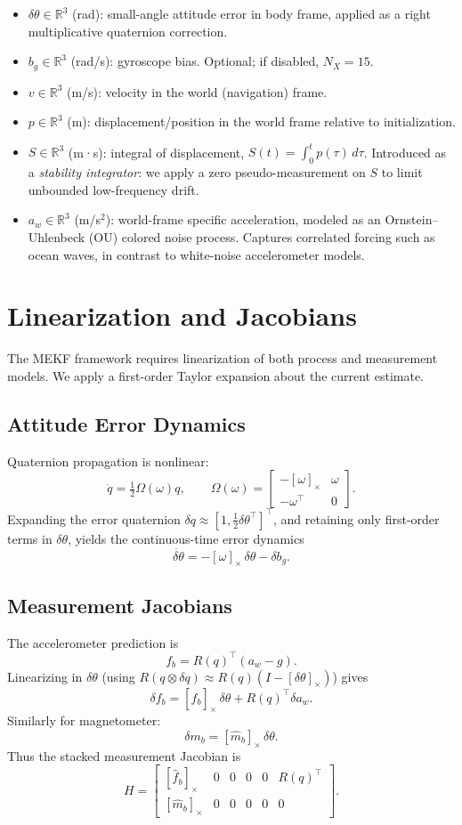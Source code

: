 \documentclass[11pt]{article}
\begin{document}
\begin{itemize}
  \item $\delta\theta\in\mathbb{R}^3$ (rad): small-angle attitude error in body frame, applied as a right multiplicative quaternion correction.
  \item $b_g\in\mathbb{R}^3$ (rad/s): gyroscope bias. Optional; if disabled, $N_X=15$.
  \item $v\in\mathbb{R}^3$ (m/s): velocity in the world (navigation) frame.
  \item $p\in\mathbb{R}^3$ (m): displacement/position in the world frame relative to initialization.
  \item $S\in\mathbb{R}^3$ (m·s): integral of displacement, $S(t)=\int_0^t p(\tau)\,d\tau$.  
        Introduced as a \emph{stability integrator}: we apply a zero pseudo-measurement on $S$ to limit unbounded low-frequency drift.
  \item $a_w\in\mathbb{R}^3$ (m/s$^2$): world-frame specific acceleration, modeled as an Ornstein--Uhlenbeck (OU) colored noise process.  
        Captures correlated forcing such as ocean waves, in contrast to white-noise accelerometer models.
\end{itemize}

\section{Linearization and Jacobians}

The MEKF framework requires linearization of both process and measurement models.  
We apply a first-order Taylor expansion about the current estimate.

\subsection{Attitude Error Dynamics}
Quaternion propagation is nonlinear:
\[
\dot q = \tfrac{1}{2}\Omega(\omega) q,\qquad
\Omega(\omega)=\begin{bmatrix}
-[\omega]_\times & \omega \\ -\omega^\top & 0
\end{bmatrix}.
\]
Expanding the error quaternion $\delta q \approx [1,\tfrac{1}{2}\delta\theta^\top]^\top$,
and retaining only first-order terms in $\delta\theta$,
yields the continuous-time error dynamics
\[
\dot{\delta\theta} = -[\omega]_\times\,\delta\theta - \delta b_g.
\]

\subsection{Measurement Jacobians}
The accelerometer prediction is
\[
f_b = R(q)^\top(a_w - g).
\]
Linearizing in $\delta\theta$ (using $R(q\!\otimes\!\delta q)\approx R(q)(I-[\delta\theta]_\times)$)
gives
\[
\delta f_b = [\hat f_b]_\times \,\delta\theta + R(q)^\top \delta a_w.
\]
Similarly for magnetometer:
\[
\delta m_b = [\hat m_b]_\times \,\delta\theta.
\]
Thus the stacked measurement Jacobian is
\[
H =
\begin{bmatrix}
[\hat f_b]_\times & 0 & 0 & 0 & 0 & R(q)^\top \\
[\hat m_b]_\times & 0 & 0 & 0 & 0 & 0
\end{bmatrix}.
\]
\end{document}
